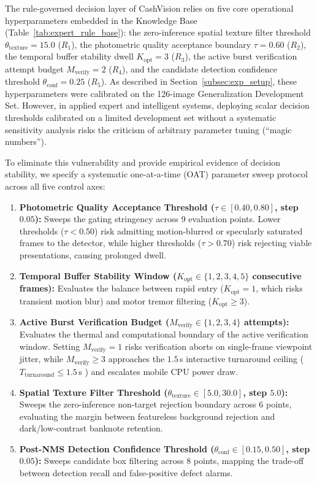 \documentclass[final,5p,times,twocolumn,authoryear]{elsarticle}
\begin{document}
The rule-governed decision layer of CashVision relies on five core operational hyperparameters embedded in the Knowledge Base (Table~\ref{tab:expert_rule_base}): the zero-inference spatial texture filter threshold $\theta_{\text{texture}} = 15.0$ ($R_1$), the photometric quality acceptance boundary $\tau = 0.60$ ($R_2$), the temporal buffer stability dwell $K_{\text{opt}} = 3$ ($R_3$), the active burst verification attempt budget $M_{\text{verify}} = 2$ ($R_4$), and the candidate detection confidence threshold $\theta_{\text{conf}} = 0.25$ ($R_5$). As described in Section~\ref{subsec:exp_setup}, these hyperparameters were calibrated on the 126-image Generalization Development Set. However, in applied expert and intelligent systems, deploying scalar decision thresholds calibrated on a limited development set without a systematic sensitivity analysis risks the criticism of arbitrary parameter tuning (``magic numbers''). 

To eliminate this vulnerability and provide empirical evidence of decision stability, we specify a systematic one-at-a-time (OAT) parameter sweep protocol across all five control axes:
\begin{enumerate}[label=(\alph*)]
    \item \textbf{Photometric Quality Acceptance Threshold ($\tau \in [0.40, 0.80]$, step $0.05$):} Sweeps the gating stringency across 9 evaluation points. Lower thresholds ($\tau < 0.50$) risk admitting motion-blurred or specularly saturated frames to the detector, while higher thresholds ($\tau > 0.70$) risk rejecting viable presentations, causing prolonged dwell.
    \item \textbf{Temporal Buffer Stability Window ($K_{\text{opt}} \in \{1, 2, 3, 4, 5\}$ consecutive frames):} Evaluates the balance between rapid entry ($K_{\text{opt}} = 1$, which risks transient motion blur) and motor tremor filtering ($K_{\text{opt}} \ge 3$).
    \item \textbf{Active Burst Verification Budget ($M_{\text{verify}} \in \{1, 2, 3, 4\}$ attempts):} Evaluates the thermal and computational boundary of the active verification window. Setting $M_{\text{verify}} = 1$ risks verification aborts on single-frame viewpoint jitter, while $M_{\text{verify}} \ge 3$ approaches the $1.5$\,s interactive turnaround ceiling ($T_{\text{turnaround}} \le 1.5$\,s \cite{Nielsen1993}) and escalates mobile CPU power draw.
    \item \textbf{Spatial Texture Filter Threshold ($\theta_{\text{texture}} \in [5.0, 30.0]$, step $5.0$):} Sweeps the zero-inference non-target rejection boundary across 6 points, evaluating the margin between featureless background rejection and dark/low-contrast banknote retention.
    \item \textbf{Post-NMS Detection Confidence Threshold ($\theta_{\text{conf}} \in [0.15, 0.50]$, step $0.05$):} Sweeps candidate box filtering across 8 points, mapping the trade-off between detection recall and false-positive defect alarms.
\end{enumerate}
\end{document}
